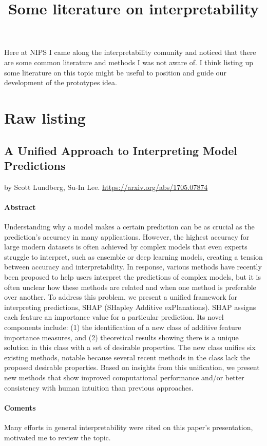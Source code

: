 \documentclass{article}
\title{Some literature on interpretability}
\author{}
\date{}
\begin{document}
\maketitle
Here at NIPS I came along the interpretability comunity and noticed that there are some common literature and methods I was not aware of. I think listing up some literature on this topic might be useful to position and guide our development of the prototypes idea.

\section{Raw listing}
\subsection{A Unified Approach to Interpreting Model Predictions}
by Scott Lundberg, Su-In Lee.
\url{https://arxiv.org/abs/1705.07874}

\paragraph{Abstract} Understanding why a model makes a certain prediction can be as crucial as the prediction's accuracy in many applications. However, the highest accuracy for large modern datasets is often achieved by complex models that even experts struggle to interpret, such as ensemble or deep learning models, creating a tension between accuracy and interpretability. In response, various methods have recently been proposed to help users interpret the predictions of complex models, but it is often unclear how these methods are related and when one method is preferable over another. To address this problem, we present a unified framework for interpreting predictions, SHAP (SHapley Additive exPlanations). SHAP assigns each feature an importance value for a particular prediction. Its novel components include: (1) the identification of a new class of additive feature importance measures, and (2) theoretical results showing there is a unique solution in this class with a set of desirable properties. The new class unifies six existing methods, notable because several recent methods in the class lack the proposed desirable properties. Based on insights from this unification, we present new methods that show improved computational performance and/or better consistency with human intuition than previous approaches.

\paragraph{Coments}
Many efforts in general interpretability were cited on this paper's presentation, motivated me to review the topic.
\end{document}
